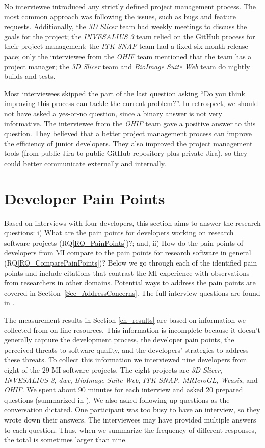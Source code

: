 \documentclass[final, 3p, times, authoryear]{elsarticle}
\newcommand{\rqref}[1]{RQ\ref{#1}}
\begin{document}
No interviewee introduced any strictly defined project management process. The
most common approach was following the issues, such as bugs and feature requests.
Additionally, the \textit{3D Slicer} team had weekly meetings to discuss the
goals for the project; the \textit{INVESALIUS 3} team relied on the GitHub
process for their project management; the \textit{ITK-SNAP} team had a fixed
six-month release pace; only the interviewee from the \textit{OHIF} team
mentioned that the team has a project manager; the \textit{3D Slicer} team and
\textit{BioImage Suite Web} team do nightly builds and tests.

Most interviewees skipped the part of the last question asking ``Do you think
improving this process can tackle the current problem?''. In retrospect, we
should not have asked a yes-or-no question, since a binary answer is not very
informative. The interviewee from the \textit{OHIF} team gave a positive answer
to this question. They believed that a better project management process can
improve the efficiency of junior developers. They also improved the project
management tools (from public Jira to public GitHub repository plus private
Jira), so they could better communicate externally and internally.

\section{Developer Pain Points} \label{painpoints}

Based on interviews with four developers, this section aims to answer the
research questions: i) What are the pain points for developers working on
research software projects (\rqref{RQ_PainPoints})?; and, ii) How do the pain
points of developers from MI compare to the pain points for research software
in general (\rqref{RQ_ComparePainPoints})?  Below we go through each of the
identified pain points and include citations that contrast the MI experience
with observations from researchers in other domains.  Potential ways to address
the pain points are covered in Section~\ref{Sec_AddressConcerns}. The full
interview questions are found in \citet{SmithEtAl2021}.

The measurement results in Section \ref{ch_results} are based on information we
collected from on-line resources. This information is incomplete because it
doesn't generally capture the development process, the developer pain points,
the perceived threats to software quality, and the developers' strategies to
address these threats. To collect this information we interviewed nine
developers from eight of the 29 MI software projects. The eight projects are
\textit{3D Slicer}, \textit{INVESALIUS 3}, \textit{dwv}, \textit{BioImage Suite
Web}, \textit{ITK-SNAP}, \textit{MRIcroGL}, \textit{Weasis}, and \textit{OHIF}.
We spent about 90 minutes for each interview and asked 20 prepared questions
(summarized in \citet{SmithEtAl2021}). We also asked following-up questions as
the conversation dictated. One participant was too busy to have an interview, so
they wrote down their answers. The interviewees may have provided multiple
answers to each question. Thus, when we summarize the frequency of different
responses, the total is sometimes larger than nine.
\end{document}
